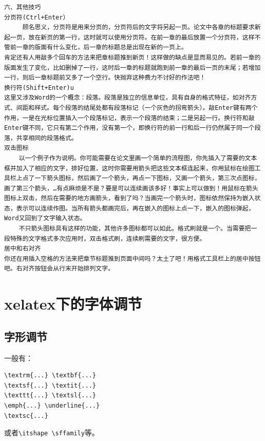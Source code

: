 \begin{verbatim}
六、其他技巧 
分页符(Ctrl+Enter） 
     顾名思义，分页符是用来分页的，分页符后的文字将另起一页。论文中各章的标题要求新起一页，放在新页的第一行，这时就可以使用分页符。在前一章的最后放置一个分页符，这样不管前一章的版面有什么变化，后一章的标题总是出现在新的一页上。 
肯定还有人用敲多个回车的方法来把章标题推到新页！这样做的缺点是显而易见的。若前一章的版面发生了变化，比如删掉了一行，这时后一章的标题就跑到前一章的最后一页的末尾；若增加一行，则后一章标题前又多了一个空行。快抛弃这种费力不讨好的作法吧！
换行符(Shift+Enter)u 
这里又涉及Word的一个概念：段落。段落是独立的信息单位，具有自身的格式特征，如对齐方式、间距和样式。每个段落的结尾处都有段落标记（一个灰色的拐弯箭头）。敲Enter键有两个作用，一是在光标位置插入一个段落标记，表示一个段落的结束；二是另起一行。换行符和敲Enter键不同，它只有第二个作用，没有第一个，即换行符的前一行和后一行仍然属于同一个段落，共享相同的段落格式。 
双击图标 
    以一个例子作为说明。你可能需要在论文里画一个简单的流程图，你先插入了需要的文本框并加入了相应的文字，排好位置，这时你需要用箭头把这些文本框连起来，你用鼠标在绘图工具栏上点了一下箭头图标，然后画了一个箭头，再点一下图标，又画一个箭头，第三次点图标，画了第三个箭头，…有点麻烦是不是？要是可以连续画该多好！事实上可以做到！用鼠标在箭头图标上双击，然后在需要的地方画箭头，看到了吗？当画完一个箭头时，图标依然保持为嵌入状态，表示可以连续作图。当所有箭头都画完后，再在嵌入的图标上点一下，嵌入的图标弹起，Word又回到了文字输入状态。 
    不只箭头图标具有这样的功能，其他许多图标都可以如此。格式刷就是一个。当需要把一段特殊的文字格式多次应用时，双击格式刷，连续刷需要的文字，很方便。 
居中和右对齐 
你还在用插入空格的方法来把章节标题推到页面中间吗？太土了吧！用格式工具栏上的居中按钮吧。右对齐按钮会从行末开始排列文字。
\end{verbatim}
\section{xelatex下的字体调节}

\subsection{字形调节}
一般有：
\begin{verbatim}
\textrm{...} \textbf{...}
\textsf{...} \textit{...} 
\texttt{...} \textsl{...}
\emph{...} \underline{...}
\textsc{...} 
\end{verbatim}
或者\verb+\itshape \sffamily+等。



